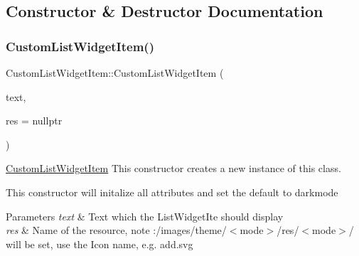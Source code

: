 \subsection{Constructor \& Destructor Documentation}
\mbox{\label{classui_1_1custom_u_i_1_1_custom_list_widget_item_a7da08f342e6eeb0a2a4833c3031a9246}} 
\subsubsection{\texorpdfstring{Custom\+List\+Widget\+Item()}{CustomListWidgetItem()}}
{\footnotesize\ttfamily Custom\+List\+Widget\+Item\+::\+Custom\+List\+Widget\+Item (\begin{DoxyParamCaption}\item[{Q\+String}]{text,  }\item[{Q\+String}]{res = {\ttfamily nullptr} }\end{DoxyParamCaption})}



\mbox{\hyperlink{classui_1_1custom_u_i_1_1_custom_list_widget_item}{Custom\+List\+Widget\+Item}} This constructor creates a new instance of this class. 

This constructor will initalize all attributes and set the default to darkmode 
\begin{DoxyParams}{Parameters}
{\em text} & Text which the List\+Widget\+Ite should display \\
\hline
{\em res} & Name of the resource, note \+:/images/theme/$<$mode$>$/res/$<$mode$>$/ will be set, use the Icon name, e.\+g. add.\+svg \\
\hline
\end{DoxyParams}
\mbox{\label{classui_1_1custom_u_i_1_1_custom_list_widget_item_abe90e419781fb947e684a4dea54568e4}} 
